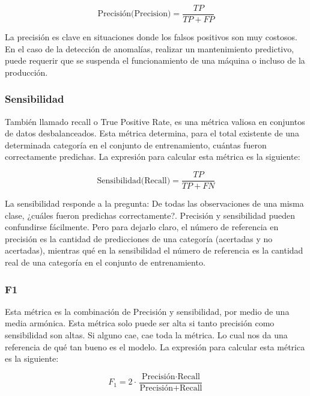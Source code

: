 \documentclass[11pt,a4paper,spanish]{book}
\numberwithin{equation}{chapter}
\numberwithin{figure}{chapter}
\begin{document}
\begin{equation}\label{eq:accuracy}
\text{Precisión(Precision)} = \frac{TP}{TP + FP}
\end{equation}

La precisión es clave en situaciones donde los falsos positivos son muy costosos. En el caso de la detección de anomalías, realizar un mantenimiento predictivo, puede requerir que se suspenda el funcionamiento de una máquina o incluso de la producción. 


\subsubsection{Sensibilidad}

También llamado recall o True Positive Rate, es una métrica valiosa en conjuntos de datos desbalanceados. Esta métrica determina, para el total existente de una determinada categoría en el conjunto de entrenamiento, cuántas fueron correctamente predichas. La expresión para calcular esta métrica es la siguiente:

\begin{equation}\label{eq:accuracy}
\text{Sensibilidad(Recall)} = \frac{TP}{TP + FN}
\end{equation}

La sensibilidad responde a la pregunta: De todas las observaciones de una misma clase, ¿cuáles fueron predichas correctamente?. Precisión y sensibilidad pueden confundirse fácilmente. Pero para dejarlo claro, el número de referencia en precisión es la cantidad de predicciones de una categoría (acertadas y no acertadas), mientras qué en la sensibilidad el número de referencia es la cantidad real de una categoría en el conjunto de entrenamiento.


\subsubsection{F1}

Esta métrica es la combinación de Precisión y sensibilidad, por medio de una media armónica. Esta métrica solo puede ser alta si tanto precisión como sensibilidad son altas. Si alguno cae, cae toda la métrica. Lo cual nos da una referencia de qué tan bueno es el modelo. La expresión para calcular esta métrica es la siguiente:

\begin{equation}\label{eq:accuracy}
F_1 = 2 \cdot \frac{\text{Precisión} \cdot \text{Recall}}{\text{Precisión} + \text{Recall}}
\end{equation}
\end{document}
